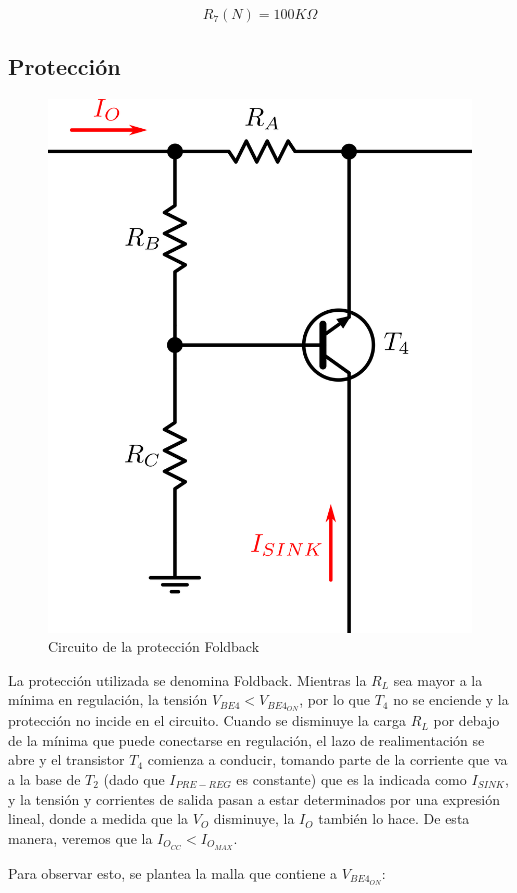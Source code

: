 $$R_7(N) = 100K\Omega$$

\newpage

\subsection{Protecci\'on}

\begin{figure}[!h]
\begin{centering}
\includegraphics[scale=0.4]{Imagenes/Proteccion.png}
\par\end{centering}
\caption{Circuito de la protecci\'on Foldback}

\end{figure}

La protecci\'on utilizada se denomina Foldback. Mientras la $R_L$ sea mayor a la m\'inima en regulaci\'on, la tensi\'on $V_{BE4} < V_{BE4_{ON}}$, por lo que $T_4$ no se enciende y la protecci\'on no incide en el circuito. Cuando se disminuye la carga $R_L$ por debajo de la m\'inima que puede conectarse en regulaci\'on, el lazo de realimentaci\'on se abre y el transistor $T_4$ comienza a conducir, tomando parte de la corriente que va a la base de $T_2$ (dado que $I_{PRE-REG}$ es constante) que es la indicada como $I_{SINK}$, y la tensi\'on y corrientes de salida pasan a estar determinados por una expresi\'on lineal, donde a medida que la $V_O$ disminuye, la $I_O$ tambi\'en lo hace. De esta manera, veremos que la $I_{O_{CC}} < I_{O_{MAX}}$.\par
Para observar esto, se plantea la malla que contiene a $V_{BE4_{ON}}$:

